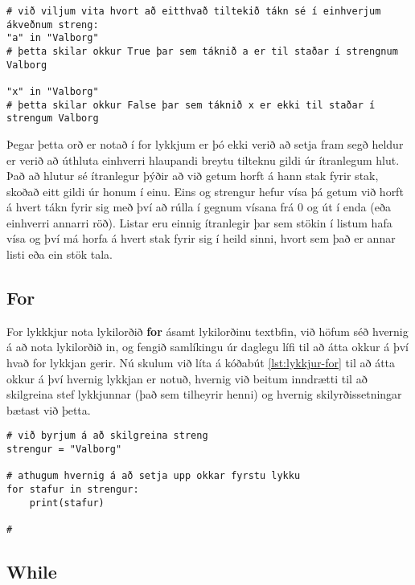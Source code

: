 \begin{lstlisting}[caption=Lykilorðið in, label=lst:lykkjur-in]
# við viljum vita hvort að eitthvað tiltekið tákn sé í einhverjum ákveðnum streng:
"a" in "Valborg"
# þetta skilar okkur True þar sem táknið a er til staðar í strengnum Valborg

"x" in "Valborg"
# þetta skilar okkur False þar sem táknið x er ekki til staðar í strengum Valborg
\end{lstlisting}

Þegar þetta orð er notað í for lykkjum er þó ekki verið að setja fram segð heldur er verið að úthluta einhverri hlaupandi breytu tilteknu gildi úr ítranlegum hlut.
Það að hlutur sé ítranlegur þýðir að við getum horft á hann stak fyrir stak, skoðað eitt gildi úr honum í einu.
Eins og strengur hefur vísa þá getum við horft á hvert tákn fyrir sig með því að rúlla í gegnum vísana frá 0 og út í enda (eða einhverri annarri röð).
Listar eru einnig ítranlegir þar sem stökin í listum hafa vísa og því má horfa á hvert stak fyrir sig í heild sinni, hvort sem það er annar listi eða ein stök tala.

\subsection{For}
For lykkkjur nota lykilorðið \textbf{for} ásamt lykilorðinu textbf{in}, við höfum séð hvernig á að nota lykilorðið in, og fengið samlíkingu úr daglegu lífi til að átta okkur á því hvað for lykkjan gerir.
Nú skulum við líta á kóðabút \ref{lst:lykkjur-for} til að átta okkur á því hvernig lykkjan er notuð, hvernig við beitum inndrætti til að skilgreina stef lykkjunnar (það sem tilheyrir henni) og hvernig skilyrðissetningar bætast við þetta.

\begin{lstlisting}[caption=For lykkjur, label=lst:lykkjur-for]
# við byrjum á að skilgreina streng
strengur = "Valborg"

# athugum hvernig á að setja upp okkar fyrstu lykku
for stafur in strengur:
	print(stafur)

# 
\end{lstlisting}


\subsection{While}